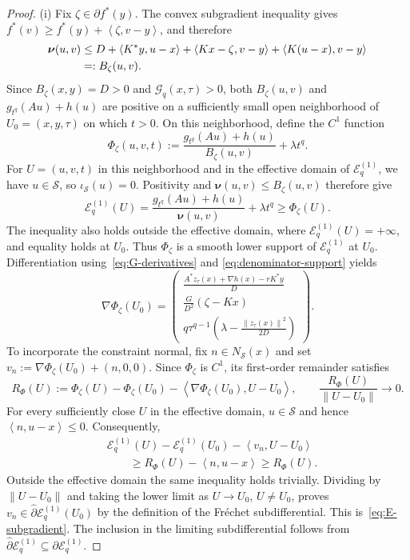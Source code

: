 \documentclass[9pt]{article}
\numberwithin{equation}{section}
\theoremstyle{definition}
\theoremstyle{remark}
\newcommand{\Sset}{\mathcal S}
\newcommand{\whpartial}{\widehat\partial}
\newcommand{\norm}[1]{\left\lVert #1\right\rVert}
\newcommand{\ip}[2]{\left\langle #1,#2\right\rangle}
\newcommand{\Gcal}{\mathcal G}
\newcommand{\Ecal}{\mathcal E}
\newcommand{\nuf}{\boldsymbol\nu}
\begin{document}
\begin{proof}
(i) Fix $\zeta\in\partial f^*(y)$. The convex subgradient inequality gives
$f^*(v)\geq f^*(y)+\ip{\zeta}{v-y}$, and therefore
\begin{align}
 \nuf(u,v)
 &\leq D+\ip{K^*y}{u-x}+\ip{Kx-\zeta}{v-y}
                   +\ip{K(u-x)}{v-y}\notag\\
 &=:B_\zeta(u,v).
 \label{eq:denominator-support}
\end{align}
Since $B_\zeta(x,y)=D>0$ and $\Gcal_q(x,\tau)>0$, both
$B_\zeta(u,v)$ and $g_{t^q}(Au)+h(u)$ are positive on a sufficiently
small open neighborhood of $U_0=(x,y,\tau)$ on which $t>0$.
On this neighborhood, define the $C^1$ function
\[
 \Phi_\zeta(u,v,t)
 :=\frac{g_{t^q}(Au)+h(u)}{B_\zeta(u,v)}+\lambda t^q.
\]
For $U=(u,v,t)$ in this neighborhood and in the effective domain
of $\Ecal_q^{(1)}$,
we have $u\in\Sset$, so $\iota_{\Sset}(u)=0$.
Positivity and $\nuf(u,v)\leq B_\zeta(u,v)$ therefore give
\[
 \Ecal_q^{(1)}(U)
 =\frac{g_{t^q}(Au)+h(u)}{\nuf(u,v)}+\lambda t^q
 \geq\Phi_\zeta(U).
\]
The inequality also holds outside the effective domain, where
$\Ecal_q^{(1)}(U)=+\infty$, and equality holds at $U_0$.
Thus $\Phi_\zeta$ is a smooth lower support of $\Ecal_q^{(1)}$
at $U_0$. Differentiation using~\eqref{eq:G-derivatives} and
\eqref{eq:denominator-support} yields
\[
 \nabla\Phi_\zeta(U_0)=
 \begin{pmatrix}
 \displaystyle\frac{A^*z_\tau(x)+\nabla h(x)-rK^*y}{D}\\[1.5ex]
 \displaystyle\frac{G}{D^2}(\zeta-Kx)\\[1.5ex]
 \displaystyle q\tau^{q-1}
       \left(\lambda-\frac{\norm{z_\tau(x)}^2}{2D}\right)
 \end{pmatrix}.
\]
To incorporate the constraint normal, fix $n\in N_{\Sset}(x)$
and set $v_n:=\nabla\Phi_\zeta(U_0)+(n,0,0)$.
Since $\Phi_\zeta$ is $C^1$, its first-order remainder satisfies
\begin{equation}\label{eq:support-remainder}
 R_\Phi(U):=\Phi_\zeta(U)-\Phi_\zeta(U_0)
                 -\ip{\nabla\Phi_\zeta(U_0)}{U-U_0},
 \qquad
 \frac{R_\Phi(U)}{\norm{U-U_0}}\longrightarrow0.
\end{equation}
For every sufficiently close $U$ in the effective domain,
$u\in\Sset$ and hence $\ip n{u-x}\leq0$. Consequently,
\[
 \begin{aligned}
 &\Ecal_q^{(1)}(U)-\Ecal_q^{(1)}(U_0)
                -\ip{v_n}{U-U_0}\\
 &\qquad\geq R_\Phi(U)-\ip n{u-x}
 \geq R_\Phi(U).
 \end{aligned}
\]
Outside the effective domain the same inequality holds trivially.
Dividing by $\norm{U-U_0}$ and taking the lower limit as
$U\to U_0$, $U\neq U_0$, proves
$v_n\in\whpartial\Ecal_q^{(1)}(U_0)$ by the definition of the
Fr\'echet subdifferential. This is~\eqref{eq:E-subgradient}.
The inclusion in the limiting subdifferential follows from
$\whpartial\Ecal_q^{(1)}\subseteq\partial\Ecal_q^{(1)}$.


\end{proof}
\end{document}
